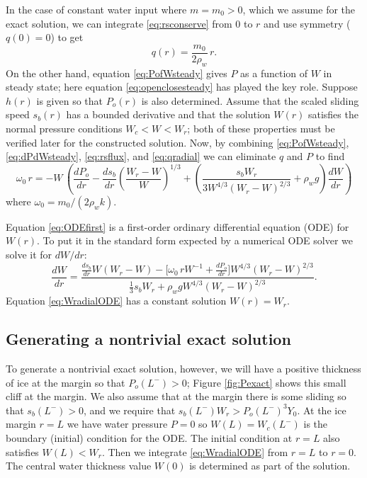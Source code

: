 \documentclass[11pt,final]{amsart}
\begin{document}
In the case of constant water input where $m = m_0 > 0$, which we assume for the exact solution, we can integrate \eqref{eq:rsconserve} from $0$ to $r$ and use symmetry ($q(0)=0$) to get
\begin{equation}
q(r) = \frac{m_0}{2\rho_w} \, r. \label{eq:qradial}
\end{equation}
On the other hand, equation \eqref{eq:PofWsteady} gives $P$ as a function of $W$ in steady state; here equation \eqref{eq:openclosesteady} has played the key role.  Suppose $h(r)$ is given so that $P_o(r)$ is also determined.  Assume that the scaled sliding speed $s_b(r)$ has a bounded derivative and that the solution $W(r)$ satisfies the normal pressure conditions $W_c < W < W_r$; both of these properties must be verified later for the constructed solution.  Now, by combining \eqref{eq:PofWsteady}, \eqref{eq:dPdWsteady}, \eqref{eq:rsflux}, and \eqref{eq:qradial} we can eliminate $q$ and $P$ to find
\begin{equation}
\omega_0\, r = - W\, \left(\frac{dP_o}{dr} - \frac{ds_b}{dr} \left(\frac{W_r - W}{W}\right)^{1/3} + \left(\frac{s_b W_r}{3 W^{4/3} (W_r - W)^{2/3}} + \rho_w g\right) \frac{dW}{dr}\right)  \label{eq:ODEfirst}
\end{equation}
where $\omega_0 = m_0 / (2 \rho_w k)$.

Equation \eqref{eq:ODEfirst} is a first-order ordinary differential equation (ODE) for $W(r)$.  To put it in the standard form expected by a numerical ODE solver we solve it for $dW/dr$:
\begin{equation}
\frac{dW}{dr} = \frac{\frac{ds_b}{dr} W (W_r - W) - \Big[\omega_0\, r W^{-1} + \frac{dP_o}{dr}\Big] W^{4/3} \left(W_r - W\right)^{2/3}}{\frac{1}{3} s_b W_r + \rho_w g W^{4/3} (W_r - W)^{2/3}}.
\label{eq:WradialODE}
\end{equation}
Equation \eqref{eq:WradialODE} has a constant solution $W(r)=W_r$.

\subsection*{Generating a nontrivial exact solution}  To generate a nontrivial exact solution, however, we will have a positive thickness of ice at the margin so that $P_o(L^-)>0$; Figure \ref{fig:Pexact} shows this small cliff at the margin.  We also assume that at the margin there is some sliding so that $s_b(L^-)>0$, and we require that $s_b(L^-) W_r > P_o(L^-)^3 Y_0$.  At the ice margin $r=L$ we have water pressure $P=0$ so $W(L)=W_c(L^-)$ is the boundary (initial) condition for the ODE.  The initial condition at $r=L$ also satisfies $W(L) < W_r$.  Then we integrate \eqref{eq:WradialODE} from $r=L$ to $r=0$.  The central water thickness value $W(0)$ is determined as part of the solution.
\end{document}
